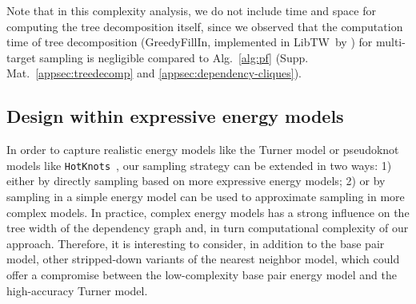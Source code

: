 \documentclass[twocolumn]{bmcart}%
\newcommand{\val}{\bar S} %
\newcommand{\Software}[1]{{\ttfamily #1}}
\newcommand{\evalfor}[2]{#1(#2)}
\newcommand{\citep}[1]{\cite{#1}}
\newcommand{\citet}[1]{\cite{#1}}
\begin{document}
Note that in this complexity analysis, we do not include time and space for computing the
tree decomposition itself, since we observed that the computation time
of tree decomposition (\Software{GreedyFillIn}, implemented in
\Software{LibTW}~by \citet{Dijk2006}) for multi-target sampling is
negligible compared to Alg.~\ref{alg:pf}
(Supp. Mat.~\ref{appsec:treedecomp} and
\ref{appsec:dependency-cliques}).

\subsection*{Design within expressive energy models}\label{sec:energy_models}



In order to capture realistic energy models like the Turner model or pseudoknot models like {\tt HotKnots}~\citep{Ren2005}, our sampling strategy can be extended in two ways: 1) either by directly sampling based on more expressive energy models; 2) or by sampling in a simple energy model can be used to approximate sampling in more complex models.  In practice, complex energy models has a strong influence on the tree width of the dependency graph and, in turn computational complexity of our approach. Therefore, it is interesting to consider, in addition to the base pair model, other
stripped-down variants of the nearest neighbor model, which could offer a compromise between the low-complexity base pair energy model and the high-accuracy Turner model. 
\end{document}
